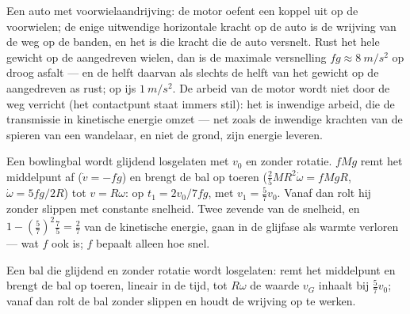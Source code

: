 \begin{example}\label{ex:b2:rigid-body-mechanics:car}
Een auto met voorwielaandrijving: de motor oefent een koppel uit op de
voorwielen; de enige uitwendige horizontale kracht op de auto is de
wrijving van de weg op de banden, en het is die kracht die de auto
versnelt. Rust het hele gewicht op de aangedreven wielen, dan is de
maximale versnelling $fg \approx \qty{8}{m/s^2}$ op droog asfalt --- en de
helft daarvan als slechts de helft van het gewicht op de aangedreven as
rust; op ijs $\qty{1}{m/s^2}$. De arbeid van de motor wordt niet door de weg
verricht (het contactpunt staat immers stil): het is inwendige arbeid, die
de transmissie in kinetische energie omzet --- net zoals de inwendige
krachten van de spieren van een wandelaar, en niet de grond, zijn energie
leveren.
\end{example}

\begin{example}\label{ex:b2:rigid-body-mechanics:bowling}
Een bowlingbal wordt glijdend losgelaten met $v_0$ en zonder rotatie.
 $fMg$ remt het middelpunt af ($\dot v = -fg$) en brengt
de bal op toeren ($\tfrac25MR^2\dot\omega = fMgR$, $\dot\omega = 5fg/2R$)
tot $v = R\omega$: op $t_1 = 2v_0/7fg$, met $v_1 = \tfrac57v_0$. Vanaf dan
rolt hij zonder slippen met constante snelheid. Twee zevende van de
snelheid, en $1 - (\tfrac57)^2\tfrac75 = \tfrac27$ van de kinetische
energie, gaan in de glijfase als warmte verloren --- wat $f$ ook is; $f$
bepaalt alleen hoe snel.
\end{example}

\begin{omfigure}

{\small Een bal die glijdend en zonder rotatie wordt losgelaten:
 remt het middelpunt en brengt de bal op toeren,
lineair in de tijd, tot $R\omega$ de waarde $v_G$ inhaalt bij
$\tfrac57v_0$; vanaf dan rolt de bal zonder slippen en houdt de wrijving
op te werken.}
\end{omfigure}

